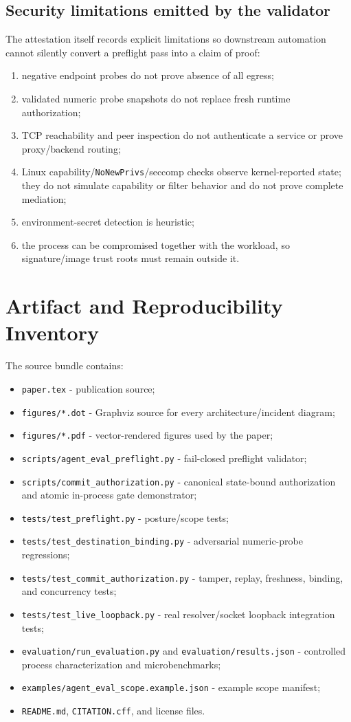 \documentclass[11pt,letterpaper]{article}
\newcommand{\code}[1]{\texttt{#1}}
\begin{document}
\subsection{Security limitations emitted by the validator}
The attestation itself records explicit limitations so downstream automation cannot silently convert a preflight pass into a claim of proof:
\begin{enumerate}
  \item negative endpoint probes do not prove absence of all egress;
  \item validated numeric probe snapshots do not replace fresh runtime authorization;
  \item TCP reachability and peer inspection do not authenticate a service or prove proxy/backend routing;
  \item Linux capability/\code{NoNewPrivs}/seccomp checks observe kernel-reported state; they do not simulate capability or filter behavior and do not prove complete mediation;
  \item environment-secret detection is heuristic;
  \item the process can be compromised together with the workload, so signature/image trust roots must remain outside it.
\end{enumerate}

\section{Artifact and Reproducibility Inventory}
The source bundle contains:
\begin{itemize}
  \item \code{paper.tex} - publication source;
  \item \code{figures/*.dot} - Graphviz source for every architecture/incident diagram;
  \item \code{figures/*.pdf} - vector-rendered figures used by the paper;
  \item \code{scripts/agent\_eval\_preflight.py} - fail-closed preflight validator;
  \item \code{scripts/commit\_authorization.py} - canonical state-bound authorization and atomic in-process gate demonstrator;
  \item \code{tests/test\_preflight.py} - posture/scope tests;
  \item \code{tests/test\_destination\_binding.py} - adversarial numeric-probe regressions;
  \item \code{tests/test\_commit\_authorization.py} - tamper, replay, freshness, binding, and concurrency tests;
  \item \code{tests/test\_live\_loopback.py} - real resolver/socket loopback integration tests;
  \item \code{evaluation/run\_evaluation.py} and \code{evaluation/results.json} - controlled process characterization and microbenchmarks;
  \item \code{examples/agent\_eval\_scope.example.json} - example scope manifest;
  \item \code{README.md}, \code{CITATION.cff}, and license files.
\end{itemize}
\end{document}

